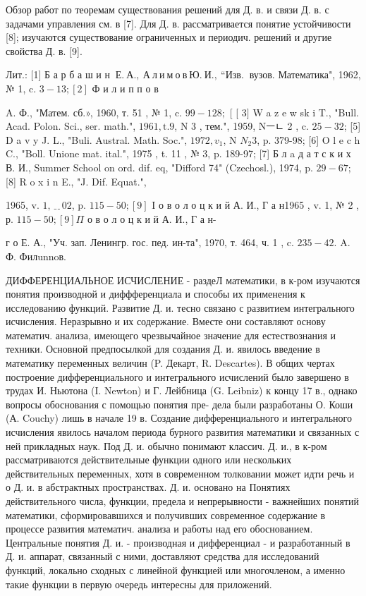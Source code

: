\documentclass[10pt]{article}
\begin{document}
Обзор работ по теоремам существования решений для Д. в. и связи Д. в. с задачами управления см. в [7]. Для Д. в. рассматривается понятие устойчивости [8]; изучаются существование ограниченных и периодич. решений и другие свойства Д. в. [9].



Лит.: [1] Б а р б а ш и н $\mathbf{~ Е . ~ А . , ~ А ~ л ~ и ~ м ~ о ~ в ~ Ю . ~ И . , ~ “ И з в . ~}$ вузов. Математика", 1962, № 1, c. $3-13 ;[2]$ Ф и л и п п о в

A. Ф., "Матем. сб.», 1960, т. 51 , № 1, c. $99-128 ;$ [ [ 3$]$ W a z e w s$\mathrm{k}$ i T., "Bull. Acad. Polon. Sci., ser. math.", $1961, \mathrm{t} .9$, N 3 , тем.", 1959, Nㅡㄴ 2 , c. $25-32$; [5] D a v y J. L., "Buli. Austral. Math. Soc.", $1972, v_{1}$, N $N_{2} 3$, p. 379-98; [6] O l e c h C., "Boll. Unione mat. ital.", 1975 , t. 11 , № 3, p. 189-97; [7] Б л a д а т с к и х В. И., Summer School on ord. dif. eq, "Difford 74" (Czechosl.), 1974, p. $29-67 ;$ [8] R o x i n E., "J. Dif. Equat.",

1965, v. $1, ﹎{0} 2$, p. $115-50 ;[9]$ I о в о л о ц к и й А. И., Г а н1965 , v. 1, № 2 , р. $115-50 ;[9] \Pi$ о в о л о ц к и й А. И., Г а н-

г о Е. А., "Уч. зап. Ленингр. гос. пед. ин-та", 1970, т. 464, ч. 1 , c. $235-42$. A. Ф. Филunnoв.



ДИФФЕРЕНЦИАЛЬНОЕ ИСЧИСЛЕНИЕ - раздеЛ математики, в к-ром изучаются понятия производной и диффференциала и способы их применения к исследованию функций. Развитие Д. и. тесно связано с развитием интегрального исчисления. Неразрывно и их содержание. Вместе они составляют основу математич. анализа, имеющего чрезвычайное значение для естествознания и техники. Основной предпосылкой для создания Д. и. явилось введение в математику переменных величин (P. Декарт, R. Descartes). В общих чертах построение дифференциального и интегрального исчислений было завершено в трудах И. Ньютона (I. Newton) и Г. Лейбница (G. Leibniz) к концу 17 в., однако вопросы обоснования с помощью понятия пре- дела были разработаны О. Коши (А. Couchy) лишь в начале 19 в. Создание дифференциального и интегрального исчисления явилось началом периода бурного развития математики и связанных с ней прикладных наук. Под Д. и. обычно понимают классич. Д. и., в к-ром рассматриваются действительные функции одного или нескольких действительных переменных, хотя в современном толковании может идти речь и о Д. и. в абстрактных пространствах. Д. и. основано на Понятиях действительного числа, функции, предела и непрерывности - важнейших понятий математики, сформировавшихся и получивших современное содержание в процессе развития математич. анализа и работы над его обоснованием. Центральные понятия Д. и. - производная и дифференциал - и разработанный в Д. и. аппарат, связанный с ними, доставляют средства для исследований функций, локально сходных с линейной функцией или многочленом, а именно такие функции в первую очередь интересны для приложений.
\end{document}
